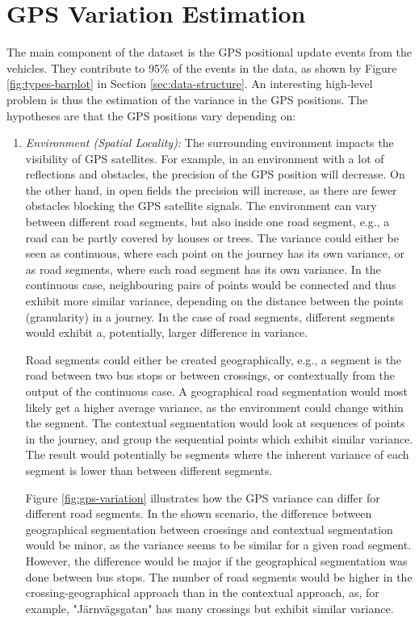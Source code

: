 \chapter{GPS Variation Estimation}
\label{cha:GPS-variation-estimation}

The main component of the dataset is the GPS positional update events from the vehicles.
They contribute to 95\% of the events in the data, as shown by Figure \ref{fig:types-barplot} in Section \ref{sec:data-structure}.
An interesting high-level problem is thus the estimation of the variance in the GPS positions.
The hypotheses are that the GPS positions vary depending on:
\begin{enumerate}
    \item \textit{Environment (Spatial Locality):} 
    The surrounding environment impacts the visibility of GPS satellites. 
    For example, in an environment with a lot of reflections and obstacles, the precision of the GPS position will decrease.
    On the other hand, in open fields the precision will increase, as there are fewer obstacles blocking the GPS satellite signals.
    The environment can vary between different road segments, but also inside one road segment, e.g., a road can be partly covered by houses or trees.
    The variance could either be seen as continuous, where each point on the journey has its own variance, or as road segments, where each road segment has its own variance.
    In the continuous case, neighbouring pairs of points would be connected and thus exhibit more similar variance, depending on the distance between the points (granularity) in a journey.
    In the case of road segments, different segments would exhibit a, potentially, larger difference in variance.
    
    Road segments could either be created geographically, e.g., a segment is the road between two bus stops or between crossings, or contextually from the output of the continuous case.
    A geographical road segmentation would most likely get a higher average variance, as the environment could change within the segment.
    The contextual segmentation would look at sequences of points in the journey, and group the sequential points which exhibit similar variance.
    The result would potentially be segments where the inherent variance of each segment is lower than between different segments.

    Figure \ref{fig:gps-variation} illustrates how the GPS variance can differ for different road segments.
    In the shown scenario, the difference between geographical segmentation between crossings and contextual segmentation would be minor, as the variance seems to be similar for a given road segment.
    However, the difference would be major if the geographical segmentation was done between bus stops.
    The number of road segments would be higher in the crossing-geographical approach than in the contextual approach, as, for example, "Järnvägsgatan" has many crossings but exhibit similar variance. 
    


\end{enumerate}
